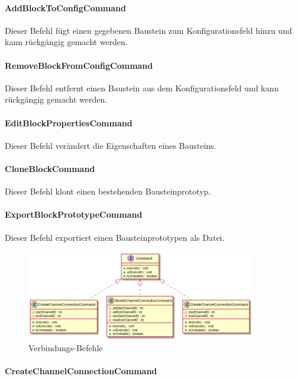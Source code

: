 \documentclass[parskip=full]{scrartcl}
\begin{document}
\paragraph{AddBlockToConfigCommand}

Dieser Befehl fügt einen gegebenen Baustein zum Konfigurationsfeld hinzu und kann rückgängig gemacht werden.

\paragraph{RemoveBlockFromConfigCommand}

Dieser Befehl entfernt einen Baustein aus dem Konfigurationsfeld und kann rückgängig gemacht werden.

\paragraph{EditBlockPropertiesCommand}

Dieser Befehl verändert die Eigenschaften eines Bausteins.

\paragraph{CloneBlockCommand}

Dieser Befehl klont einen bestehenden Bausteinprototyp.

\paragraph{ExportBlockPrototypeCommand}

Dieser Befehl exportiert einen Bausteinprototypen als Datei.

\begin{figure}[htbp]
	\begin{center}
		\includegraphics[width = 10cm]{Grafiken/Commands2.png}
		\caption{Verbindungs-Befehle}
		\label{Commands2}
	\end{center}
\end{figure}

\paragraph{CreateChannelConnectionCommand}
\end{document}
